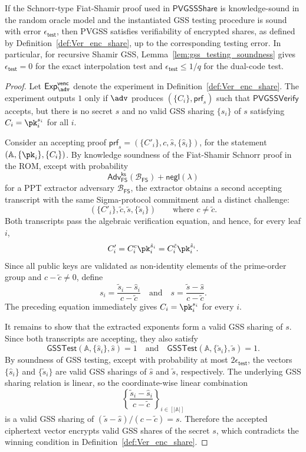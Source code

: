 \documentclass[runningheads]{llncs}
\newcommand{\gsstest}{\mathsf{GSSTest}}
\newcommand{\pvgssShare}{\mathsf{PVGSSShare}}
\newcommand{\pvgssVerify}{\mathsf{PVGSSVerify}}
\newcommand{\proofs}{\mathsf{prf}}
\begin{document}
\begin{theorem}\label{theo:ver_enc_shares}
    If the Schnorr-type Fiat-Shamir proof used in \(\pvgssShare\) is knowledge-sound in the random oracle model and the instantiated GSS testing procedure is sound with error \(\epsilon_{\mathsf{test}}\), then PVGSS satisfies verifiability of encrypted shares, as defined by Definition~\ref{def:Ver_enc_share}, up to the corresponding testing error. In particular, for recursive Shamir GSS, Lemma~\ref{lem:gss_testing_soundness} gives \(\epsilon_{\mathsf{test}}=0\) for the exact interpolation test and \(\epsilon_{\mathsf{test}}\leq 1/q\) for the dual-code test.
\end{theorem}
\begin{proof}
Let \(\mathsf{Exp}^{\mathsf{venc}}_{\adv}\) denote the experiment in Definition~\ref{def:Ver_enc_share}. The experiment outputs \(1\) only if \(\adv\) produces \((\{C_i\},\proofs_s)\) such that \(\pvgssVerify\) accepts, but there is no secret \(s\) and no valid GSS sharing \(\{s_i\}\) of \(s\) satisfying \(C_i=\pk_i^{s_i}\) for all \(i\).

Consider an accepting proof
$\proofs_s=(\{C'_i\},c,\hat{s},\{\hat{s}_i\})$,
for the statement \((\mathbb{A},\{\pk_i\},\{C_i\})\). By knowledge soundness of the Fiat-Shamir Schnorr proof in the ROM, except with probability
\[
    \mathsf{Adv}^{\mathsf{ks}}_{\mathsf{FS}}(\mathcal{B}_{\mathsf{FS}})
    +\mathsf{negl}(\lambda)
\]
for a PPT extractor adversary \(\mathcal{B}_{\mathsf{FS}}\), the extractor obtains a second accepting transcript with the same Sigma-protocol commitment and a distinct challenge:
\[
    (\{C'_i\},\tilde c,\tilde{s},\{\tilde{s}_i\})
    \qquad\text{where } c\neq \tilde c .
\]
Both transcripts pass the algebraic verification equation, and hence, for every leaf \(i\),
\[
    C'_i=C_i^c\pk_i^{\hat{s}_i}
        =C_i^{\tilde c}\pk_i^{\tilde{s}_i}.
\]
Since all public keys are validated as non-identity elements of the prime-order group and \(c-\tilde c\neq 0\), define
\[
    s_i=\frac{\tilde{s}_i-\hat{s}_i}{c-\tilde c}
    \quad\text{and}\quad
    s=\frac{\tilde{s}-\hat{s}}{c-\tilde c}.
\]
The preceding equation immediately gives \(C_i=\pk_i^{s_i}\) for every \(i\).

It remains to show that the extracted exponents form a valid GSS sharing of \(s\). Since both transcripts are accepting, they also satisfy
\[
    \gsstest(\mathbb{A},\{\hat{s}_i\},\hat{s})=1
    \quad\text{and}\quad
    \gsstest(\mathbb{A},\{\tilde{s}_i\},\tilde{s})=1.
\]
By soundness of GSS testing, except with probability at most \(2\epsilon_{\mathsf{test}}\), the vectors \(\{\hat{s}_i\}\) and \(\{\tilde{s}_i\}\) are valid GSS sharings of \(\hat{s}\) and \(\tilde{s}\), respectively. The underlying GSS sharing relation is linear, so the coordinate-wise linear combination
\[
    \left\{\frac{\tilde{s}_i-\hat{s}_i}{c-\tilde c}\right\}_{i\in[|\mathbb{A}|]}
\]
is a valid GSS sharing of \((\tilde{s}-\hat{s})/(c-\tilde c)=s\). Therefore the accepted ciphertext vector encrypts valid GSS shares of the secret \(s\), which contradicts the winning condition in Definition~\ref{def:Ver_enc_share}.


\end{proof}
\end{document}
